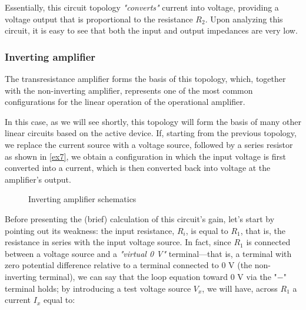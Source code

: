 \documentclass[../main.tex]{subfiles}
\begin{document}
Essentially, this circuit topology \textit{"converts"} current into voltage, providing a voltage output that is proportional to the resistance $R_2$. Upon analyzing this circuit, it is easy to see that both the input and output impedances are very low.

\subsubsection{Inverting amplifier}

The transresistance amplifier forms the basis of this topology, which, together with the non-inverting amplifier, represents one of the most common configurations for the linear operation of the operational amplifier. 

In this case, as we will see shortly, this topology will form the basis of many other linear circuits based on the active device. If, starting from the previous topology, we replace the current source with a voltage source, followed by a series resistor as shown in \autoref{ex7}, we obtain a configuration in which the input voltage is first converted into a current, which is then converted back into voltage at the amplifier’s output.

\begin{figure}
\begin{center}

	
\label{ex8}	
\caption{Inverting amplifier schematics}
\end{center}	
\end{figure}


Before presenting the (brief) calculation of this circuit’s gain, let’s start by pointing out its weakness: the input resistance, $R_i$, is equal to $R_1$, that is, the resistance in series with the input voltage source. 
In fact, since $R_1$ is connected between a voltage source and a \textit{"virtual 0 V"} terminal—that is, a terminal with zero potential difference relative to a terminal connected to 0 V (the non-inverting terminal), we can say that the loop equation toward 0 V via the "$-$" terminal holds; by introducing a test voltage source $V_x$, we will have, across $R_1$ a current $I_x$ equal to:
\end{document}
